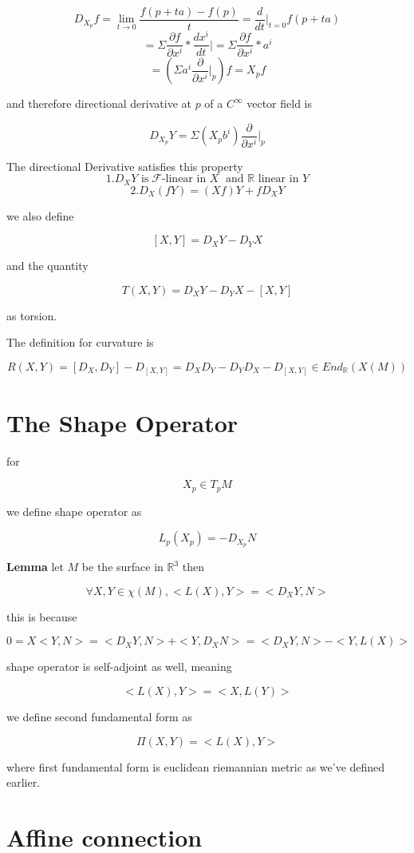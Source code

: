 \documentclass{article}
\begin{document}
\[
D_{X_p}f=\lim_{t\rightarrow0} \frac{f(p+ta)-f(p)}{t}=\frac{d}{dt}|_{t=0}f(p+ta)
\]
\[
=\Sigma\frac{\partial f}{\partial x^i}*\frac{dx^i}{dt}|=\Sigma\frac{\partial f}{\partial x^i}*a^i
\]
\[
=(\Sigma a^i\frac{\partial}{\partial x^i}|_p)f=X_pf
\]

and therefore directional derivative at $p$ of a $C^\infty$ vector field is

\[
D_{X_p}Y=\Sigma(X_pb^i)\frac{\partial}{\partial x^i}|_p
\]

The directional Derivative satisfies this property
\[
1. D_XY \text{ is} \; \mathcal{F}\text{-linear in } X \;\text{ and } \mathbb{R} \text{ linear in } Y
\]
\[
2. D_X(fY)=(Xf)Y+fD_XY
\]

we also define 

\[
[X,Y]=D_XY-D_YX
\]

and the quantity 

\[
T(X,Y)=D_XY-D_YX-[X,Y]
\]

as torsion. 

The definition for curvature is

\[
R(X,Y)=[D_X,D_Y]-D_{[X,Y]} =D_XD_Y-D_YD_X-D_{[X,Y]} \in End_\mathbb{R}(X(M))
\]

\section*{The Shape Operator}

for 

\[
X_p\in T_pM
\]

we define shape operator as

\[
L_p(X_p)=-D_{X_p}N
\]

\textbf{Lemma} let $M$ be the surface in $\mathbb{R}^3$ then 

\[
\forall X,Y\in \chi(M), <L(X),Y>=<D_XY,N>
\]

this is because

\[
0=X<Y,N>=<D_XY,N>+<Y,D_XN>=<D_XY,N>-<Y,L(X)>
\]

shape operator is self-adjoint as well, meaning

\[
<L(X),Y>=<X,L(Y)>
\]

we define second fundamental form as 

\[
\Pi(X,Y)=<L(X),Y>
\]

where first fundamental form is euclidean riemannian metric as we've defined earlier.

\section*{Affine connection}
\end{document}
